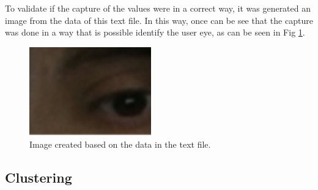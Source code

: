 \documentclass[10pt, conference]{IEEEtran}
\begin{document}
	To validate if the capture of the values were in a correct way, it was generated an image from the data of this text file. 
	In this way, once can be see that the capture was done in a way that is possible identify the user eye, as can be seen in Fig \ref{fig:fig13}.

    \begin{figure}[t]
      \centering
      \includegraphics{figures/pic13.png}
      \caption{Image created based on the data in the text file.}
      \label{fig:fig13}
    \end{figure}

\subsection{Clustering}
\end{document}
